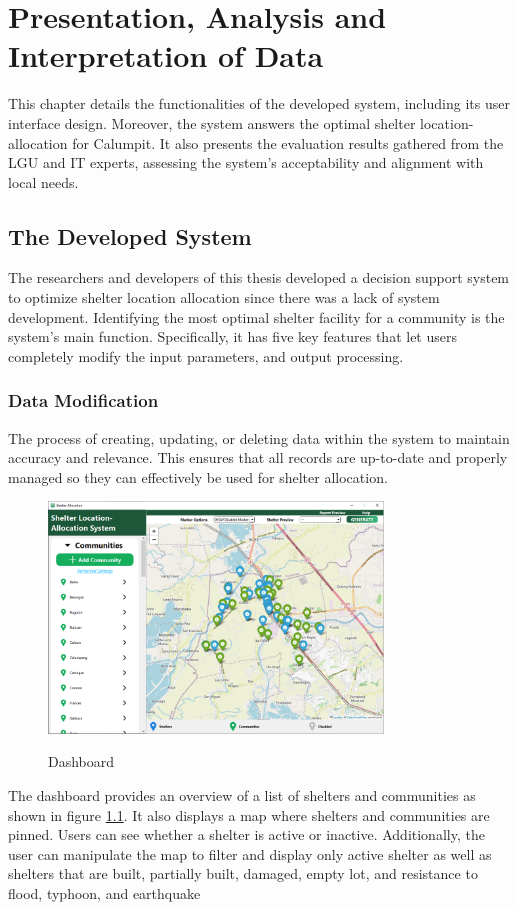\chapter{Presentation, Analysis and Interpretation of Data}
	This chapter details the functionalities of the developed system, including its user interface design. Moreover, the system answers the optimal shelter location-allocation for Calumpit. It also presents the evaluation results gathered from the LGU and IT experts, assessing the system’s acceptability and alignment with local needs.

\section{The Developed System}
	The researchers and developers of this thesis developed a decision support system to optimize shelter location allocation since there was a lack of system development. Identifying the most optimal shelter facility for a community is the system's main function. Specifically, it has five key features that let users completely modify the input parameters, and output processing. 


\subsection{Data Modification}
	The process of creating, updating, or deleting data within the system to maintain accuracy and relevance. This ensures that all records are up-to-date and properly managed so they can effectively be used for shelter allocation.
	
	\begin{figure}[h!]
		\caption{Dashboard}
		\centering
		\includegraphics[width=3.5in]{Chapter 4/dashboard}
		\label{db}
	\end{figure}
	The dashboard provides an overview of a list of shelters and communities as shown in figure \ref{db}. It also displays a map where shelters and communities are pinned. Users can see whether a shelter is active or inactive. Additionally, the user can manipulate the map to filter and display only active shelter as well as shelters that are built, partially built, damaged, empty lot, and resistance to flood, typhoon, and earthquake
	

